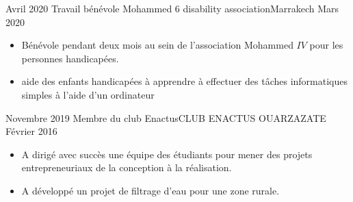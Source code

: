 %
%
%

\begin{experiences}

  \experience
    {Avril 2020}     {Travail bénévole} %
    {Mohammed 6 disability association}{Marrakech}
    {Mars 2020} {
                      \begin{itemize}
						\item { Bénévole pendant deux mois au sein de l'association Mohammed $IV$  pour les personnes handicapées.}
						\item {aide des enfants handicapées à apprendre à effectuer des tâches informatiques simples à l'aide d'un ordinateur }  
                      \end{itemize}}
                    {}
  \emptySeparator       
  \experience
  {Novembre 2019}  {Membre du club Enactus}{CLUB ENACTUS OUARZAZATE}{}
  {Février 2016}   {
                      \begin{itemize}
						\item {A dirigé avec succès une équipe des étudiants pour mener des projets entrepreneuriaux de la conception à la réalisation.}
						\item {A développé un projet de filtrage d'eau pour une zone rurale.}				   
                      \end{itemize}
                  }
                  {}  
\end{experiences}

